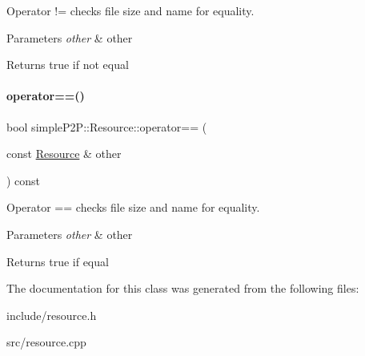 Operator != checks file size and name for equality. 


\begin{DoxyParams}{Parameters}
{\em other} & other \\
\hline
\end{DoxyParams}
\begin{DoxyReturn}{Returns}
true if not equal 
\end{DoxyReturn}
\mbox{\label{classsimpleP2P_1_1Resource_a0b42735bed5ab425b9e26b660ededecf}} 
\paragraph{\texorpdfstring{operator==()}{operator==()}}
{\footnotesize\ttfamily bool simple\+P2\+P\+::\+Resource\+::operator== (\begin{DoxyParamCaption}\item[{const \hyperlink{classsimpleP2P_1_1Resource}{Resource} \&}]{other }\end{DoxyParamCaption}) const}



Operator == checks file size and name for equality. 


\begin{DoxyParams}{Parameters}
{\em other} & other \\
\hline
\end{DoxyParams}
\begin{DoxyReturn}{Returns}
true if equal 
\end{DoxyReturn}


The documentation for this class was generated from the following files\+:\begin{DoxyCompactItemize}
\item 
include/resource.\+h\item 
src/resource.\+cpp\end{DoxyCompactItemize}
